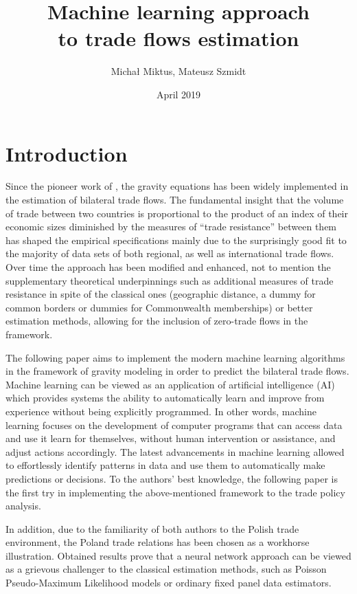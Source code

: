 \documentclass{Trade_template}
\author{Michał Miktus, Mateusz Szmidt}
\title{Machine learning approach \\
to trade flows estimation}
\date{April 2019}
\numberwithin{equation}{section}
\begin{document}
\maketitle

\tableofcontents
\listoffigures
\listoftables


\chapter*{Introduction} \label{Introduction}

Since the pioneer work of \citet{tinbergen1962analysis}, the gravity equations has been widely implemented in the estimation of bilateral trade flows. The fundamental insight that the volume of trade between two countries is proportional to the product of an index of their economic sizes diminished by the measures of “trade resistance” between them has shaped the empirical specifications mainly due to the surprisingly good fit to the majority of data sets of both regional, as well as international trade flows. Over time the \citet{tinbergen1962analysis} approach has been modified and enhanced, not to mention the supplementary theoretical underpinnings such as additional measures of trade resistance in spite of the classical ones (geographic distance, a dummy for common borders or dummies for Commonwealth memberships) or better estimation methods, allowing for the inclusion of zero-trade flows in the framework. 

The following paper aims to implement the modern machine learning algorithms in the framework of gravity modeling in order to predict the bilateral trade flows. Machine learning can be viewed as an application of artificial intelligence (AI) which provides systems the ability to automatically learn and improve from experience without being explicitly programmed. In other words, machine learning focuses on the development of computer programs that can access data and use it learn for themselves, without human intervention or assistance, and adjust actions accordingly. The latest advancements in machine learning allowed to effortlessly identify patterns in data and use them to automatically make predictions or decisions. To the authors' best knowledge, the following paper is the first try in implementing the above-mentioned framework to the trade policy analysis.

In addition, due to the familiarity of both authors to the Polish trade environment, the Poland trade relations has been chosen as a workhorse illustration. Obtained results prove that a neural network approach can be viewed as a grievous challenger to the classical estimation methods, such as Poisson Pseudo-Maximum Likelihood models or ordinary fixed panel data estimators.
\end{document}
